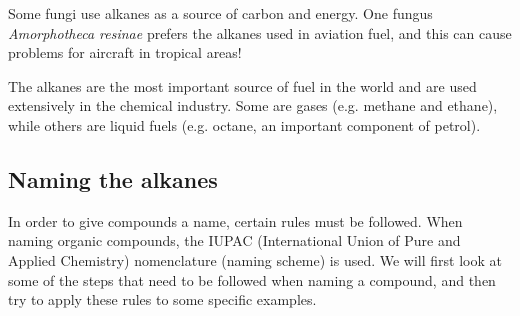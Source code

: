 \begin{IFact}{Some fungi use alkanes as a source of carbon and energy. One fungus \textit{Amorphotheca resinae} prefers the alkanes used in aviation fuel, and this can cause problems for aircraft in tropical areas!}
\end{IFact}

The alkanes are the most important source of fuel in the world and are used extensively in the chemical industry. Some are gases (e.g. methane and ethane), while others are liquid fuels (e.g. octane, an important component of petrol).



\subsection{Naming the alkanes}

In order to give compounds a name, certain rules must be followed. When naming organic compounds, the IUPAC (International Union of Pure and Applied Chemistry) nomenclature (naming scheme) is used. We will first look at some of the steps that need to be followed when naming a compound, and then try to apply these rules to some specific examples.


